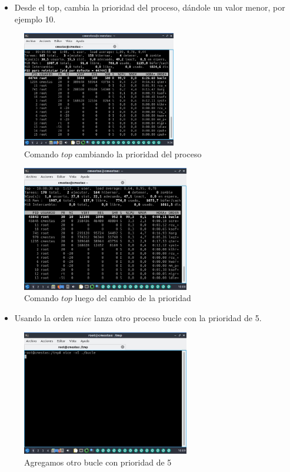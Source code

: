 \documentclass[12pt]{article}
\begin{document}
\begin{itemize}
    \item Desde el top, cambia la prioridad del proceso, dándole un valor menor, por ejemplo 10.
\end{itemize}

\begin{figure}[h]
    \centering
    \includegraphics[width=0.6\textwidth]{images/screenA18.jpg}
    \caption{Comando $top$ cambiando la prioridad del proceso}
\end{figure}

\clearpage
\newpage

\begin{figure}[h]
    \centering
    \includegraphics[width=0.65\textwidth]{images/screenA20.jpg}
    \caption{Comando $top$ luego del cambio de la prioridad}
\end{figure}

\begin{itemize}
    \item Usando la orden $nice$ lanza otro proceso bucle con la prioridad de 5.
\end{itemize}

\begin{figure}[h]
    \centering
    \includegraphics[width=0.65\textwidth]{images/screenA21.jpg}
    \caption{Agregamos otro bucle con prioridad de 5}
\end{figure}
\end{document}
